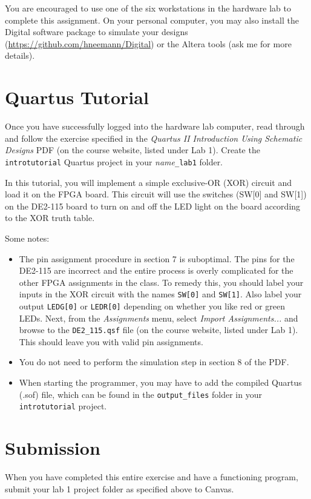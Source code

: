 \documentclass[10pt]{article}
\begin{document}
You are encouraged to use one of the six workstations in the hardware
lab to complete this assignment. On your personal computer, you may also install the Digital software package to simulate your designs (\url{https://github.com/hneemann/Digital}) or the Altera tools (ask me for more details).

\section{Quartus Tutorial}

Once you have successfully logged into the hardware lab computer,
read through and follow the exercise specified in the {\em
  Quartus II Introduction Using Schematic Designs} PDF (on
the course website, listed under Lab 1). Create the {\tt introtutorial} Quartus project in your {\em
  name}{\tt\_lab1} folder.


In this tutorial, you will implement a simple exclusive-OR (XOR)
circuit and load it on the FPGA board. This circuit will use the
switches (SW[0] and SW[1]) on the DE2-115 board to turn on and off the LED
light on the board according to the XOR truth table.

Some notes:

\begin{itemize}
  \item The pin assignment procedure in section 7 is suboptimal. The pins
    for the DE2-115 are incorrect and the entire process is overly complicated for
    the other FPGA assignments in the class. To remedy this, you should label your
    inputs in the XOR circuit with the names {\tt SW[0]} and {\tt SW[1]}. Also label your
    output {\tt LEDG[0]} or {\tt LEDR[0]} depending on whether you like red or green LEDs.
    Next, from the {\it Assignments} menu, select {\it Import Assignments...} and
    browse to the {\tt DE2\_115.qsf} file (on the course website, listed under Lab 1). This should leave you
    with valid pin assignments.

  \item You do not need to perform the simulation step in section 8 of the PDF.

  \item When starting the programmer, you may have to add the compiled Quartus
    (.sof) file, which can be found in the {\tt output\_files} folder in your
    {\tt introtutorial} project.
\end{itemize}


\section*{Submission}

When you have completed this entire exercise and have a functioning
program, submit your lab 1 project folder as specified above to Canvas.
\end{document}

